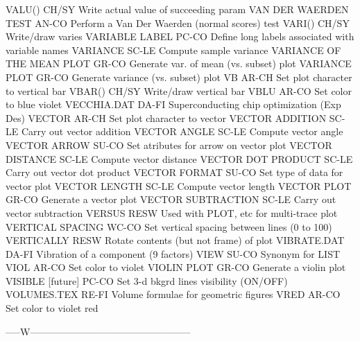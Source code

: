 VALU()                      CH/SY Write actual value of succeeding param
VAN DER WAERDEN TEST        AN-CO Perform a Van Der Waerden (normal scores) test
VARI()                      CH/SY Write/draw varies
VARIABLE LABEL              PC-CO Define long labels associated with variable names
VARIANCE                    SC-LE Compute sample variance
VARIANCE OF THE MEAN PLOT   GR-CO Generate var. of mean (vs. subset) plot
VARIANCE PLOT               GR-CO Generate variance (vs. subset) plot
VB                          AR-CH Set plot character to vertical bar
VBAR()                      CH/SY Write/draw vertical bar
VBLU                        AR-CO Set color to blue violet
VECCHIA.DAT                 DA-FI Superconducting chip optimization (Exp Des)
VECTOR                      AR-CH Set plot character to vector
VECTOR ADDITION             SC-LE Carry out vector addition
VECTOR ANGLE                SC-LE Compute vector angle
VECTOR ARROW                SU-CO Set atributes for arrow on vector plot
VECTOR DISTANCE             SC-LE Compute vector distance
VECTOR DOT PRODUCT          SC-LE Carry out vector dot product
VECTOR FORMAT               SU-CO Set type of data for vector plot
VECTOR LENGTH               SC-LE Compute vector length
VECTOR PLOT                 GR-CO Generate a vector plot
VECTOR SUBTRACTION          SC-LE Carry out vector subtraction
VERSUS                      RESW  Used with PLOT, etc for multi-trace plot
VERTICAL SPACING            WC-CO Set vertical spacing between lines (0 to 100)
VERTICALLY                  RESW  Rotate contents (but not frame) of plot
VIBRATE.DAT                 DA-FI Vibration of a component (9 factors)
VIEW                        SU-CO Synonym for LIST
VIOL                        AR-CO Set color to violet
VIOLIN PLOT                 GR-CO Generate a violin plot
VISIBLE    [future]         PC-CO Set 3-d bkgrd lines visibility (ON/OFF)
VOLUMES.TEX                 RE-FI Volume formulae for geometric figures
VRED                        AR-CO Set color to violet red

-----W--------------------------------------------------

